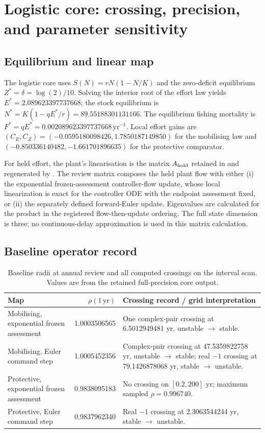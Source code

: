 \section{Logistic core: crossing, precision, and parameter sensitivity}\label{si:core}

\subsection{Equilibrium and linear map}

The logistic core uses \(S(N)=rN(1-N/K)\) and the zero-deficit equilibrium \(Z^*=\delta=\log(2)/10\). Solving the interior root of the effort law yields \(E^*=2.089623397737668\); the stock equilibrium is \(N^*=K(1-qE^*/r)=89.55188301131166\). The equilibrium fishing mortality is \(F^*=qE^*=0.002089623397737668\,\mathrm{yr}^{-1}\). Local effort gains are \((C_E,C_Z)=(-0.0595180098426,1.7850187149850)\) for the mobilising law and \((-0.850336140482,-1.661701896635)\) for the protective comparator.

For held effort, the plant's linearisation is the matrix \(A_{\rm hold}\) retained in \texttt{} and regenerated by \texttt{}. The review matrix composes the held plant flow with either (i) the exponential frozen-assessment controller-flow update, whose local linearization is exact for the controller ODE with the endpoint assessment fixed, or (ii) the separately defined forward-Euler update. Eigenvalues are calculated for the product in the registered flow-then-update ordering. The full state dimension is three; no continuous-delay approximation is used in this matrix calculation.

\subsection{Baseline operator record}

\begin{table}[htbp]
\centering\small
\caption{Baseline radii at annual review and all computed crossings on the interval scan. Values are from the retained full-precision core output.}
\label{tab:core-crossings}
\begin{tabularx}{\linewidth}{@{}l r X@{}}
\toprule Map & \(\rho(1\,\mathrm{yr})\) & Crossing record / grid interpretation \\
\midrule
Mobilising, exponential frozen assessment & 1.0003506565 & One complex-pair crossing at 6.5012949481 yr, unstable \(\to\) stable. \\
Mobilising, Euler command step & 1.0005452356 & Complex-pair crossing at 47.5359822758 yr, unstable \(\to\) stable; real \(-1\) crossing at 79.1426878068 yr, stable \(\to\) unstable. \\
Protective, exponential frozen assessment & 0.9838095183 & No crossing on \([0.2,200]\) yr; maximum sampled \(\rho=0.996740\). \\
Protective, Euler command step & 0.9837962340 & Real \(-1\) crossing at 2.3063544244 yr, stable \(\to\) unstable. \\
\bottomrule
\end{tabularx}
\end{table}

